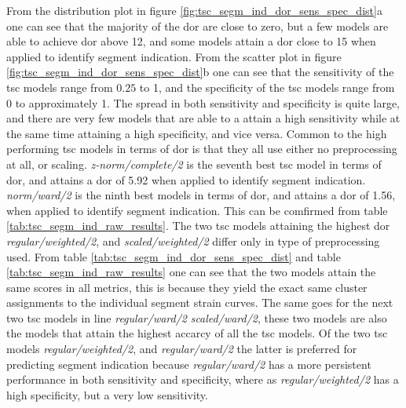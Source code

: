 From the distribution plot in figure \ref{fig:tsc_segm_ind_dor_sens_spec_dist}a one can see that the majority of the \acrshort{dor} are close to zero, but a few models are able to achieve \acrshort{dor} above 12, and some models attain a \acrshort{dor} close to 15 when applied to identify segment indication. From the scatter plot in figure \ref{fig:tsc_segm_ind_dor_sens_spec_dist}b one can see that the sensitivity of the \acrshort{tsc} models range from $0.25$ to 1, and the specificity of the \acrshort{tsc} models range from 0 to approximately 1. The spread in both sensitivity and specificity is quite large, and there are very few models that are able to a attain a high sensitivity while at the same time attaining a high specificity, and vice versa. Common to the high performing \acrshort{tsc} models in terms of \acrshort{dor} is that they all use either no preprocessing at all, or scaling. \textit{z-norm/complete/2} is the seventh best \acrshort{tsc} model in terms of \acrshort{dor}, and attains a \acrshort{dor} of 5.92 when applied to identify segment indication. \textit{norm/ward/2} is the ninth best models in terms of \acrshort{dor}, and attains a \acrshort{dor} of 1.56, when applied to identify segment indication. This can be comfirmed from table \ref{tab:tsc_segm_ind_raw_results}. The two \acrshort{tsc} models attaining the highest \acrshort{dor} \textit{regular/weighted/2}, and \textit{scaled/weighted/2} differ only in type of preprocessing used. From table \ref{tab:tsc_segm_ind_dor_sens_spec_dist} and table \ref{tab:tsc_segm_ind_raw_results} one can see that the two models attain the same scores in all metrics, this is because they yield the exact same cluster assignments to the individual segment strain curves. The same goes for the next two \acrshort{tsc} models in line \textit{regular/ward/2} \textit{scaled/ward/2}, these two models are also the models that attain the highest accarcy of all the \acrshort{tsc} models. Of the two \acrshort{tsc} models \textit{regular/weighted/2}, and \textit{regular/ward/2} the latter is preferred for predicting segment indication because \textit{regular/ward/2} has a more persistent performance in both sensitivity and specificity, where as \textit{regular/weighted/2} has a high specificity, but a very low sensitivity.

